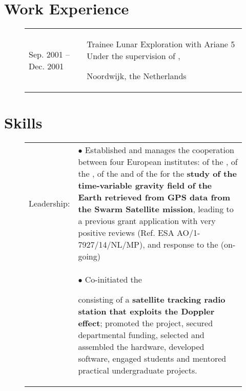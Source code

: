 \documentclass[a4paper]{article}
\newcommand{\dynhref}[2]{%
  \iftoggle{expliciturl}{%
    #2 (\href{#1}{\texttt{\detokenize{#1}}})%
  }{%
    \href{#1}{#2}%
  }%
}
\newlength{\listskipbig}
\newlength{\listskipsmall}
\newenvironment{cvsection}[2]{
  \setlength{\floatsep}{0pt}
  \setlength{\textfloatsep}{0pt}
  \setlength{\intextsep}{0pt}
  \section*{#1}
  \begin{figure}[H]
  \begin{longtable}{lp{#2}}
}{
  \end{longtable}
  \end{figure}
}
\begin{document}
\begin{cvsection}{Work Experience}{10.8cm}
Sep. 2001 -- Dec. 2001
  & Trainee\newline
    Lunar Exploration with Ariane 5\newline
    Under the supervision of \dynhref{https://en.wikipedia.org/wiki/Wubbo_Ockels}{Prof. Wubbo Ockels}\newline
    \dynhref{http://www.esa.int/About_Us/ESTEC}{European Space research and Technology Center (ESTEC)}, \dynhref{http://www.esa.int}{European Space Agency (ESA)}
    Noordwijk, the Netherlands\\[\listskipbig]

\end{cvsection}


\begin{cvsection}{Skills}{11.2cm}
Leadership: & $\bullet$ Established and manages the cooperation between four European institutes:\newline
  \dynhref{http://www.itsg.tugraz.at}{Institute of Geodesy} of the \dynhref{http://www.tugraz.at}{Graz University of Technology}, \newline
  \dynhref{http://www.asu.cas.cz/en}{Astronomical Institute} of the \dynhref{http://www.cas.cz/index.html}{Academy of Sciences of the Czech Republic}, \newline
  \dynhref{http://www.aiub.unibe.ch}{Astronomical Institute of the University of Bern} \newline
  \dynhref{http://www.lr.tudelft.nl}{Aerospace Faculty} of the \dynhref{http://www.tudelft.nl}{Delft University of Technology} and\newline
  \dynhref{https://earthsciences.osu.edu}{School of Earth Sciences} of the \dynhref{https://www.osu.edu}{Ohio State University} \newline
  for the {\bf study of the time-variable gravity field of the Earth retrieved from GPS data from the Swarm Satellite mission}, leading to a previous grant application with very positive reviews (Ref. ESA AO/1-7927/14/NL/MP), and response to the \dynhref{http://tinyurl.com/SwarmGrav}{ITT posted by the ESA-funded DISC consortium} (on-going)\\[\listskipsmall]

            & $\bullet$ Co-initiated the \dynhref{http://doptrack.tudelft.nl}{DopTrack project}
              consisting of a {\bf satellite tracking radio station that exploits the Doppler effect}; promoted the project, secured departmental funding, selected and assembled the hardware, developed software, engaged students and mentored practical undergraduate projects.\\[\listskipbig]


\end{cvsection}
\end{document}
